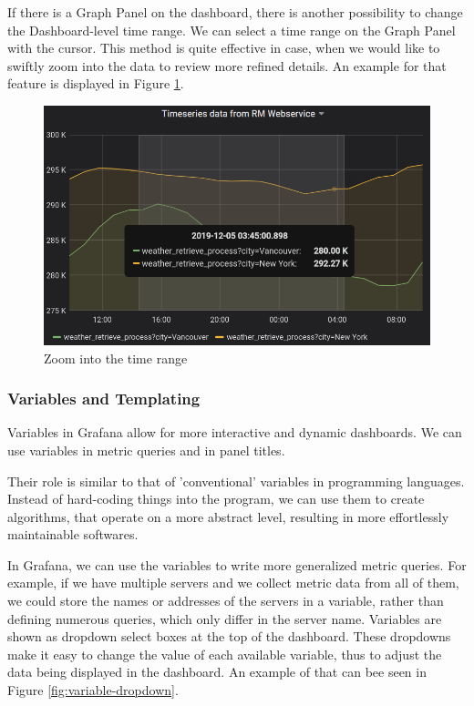 If there is a Graph Panel on the dashboard, there is another possibility to change the Dashboard-level time range. We can select a time range on the Graph Panel with the cursor. This method is quite effective in case, when we would like to swiftly zoom into the data to review more refined details. An example for that feature is displayed in Figure \ref{fig:select-time}.

\begin{figure}[h]
	\centering
	\includegraphics[width=130mm, keepaspectratio]{figures/select-time.png}
	\caption{Zoom into the time range}
	\label{fig:select-time}
\end{figure}

\subsubsection{Variables and Templating}

Variables in Grafana allow for more interactive and dynamic dashboards. We can use variables in metric queries and in panel titles.

Their role is similar to that of 'conventional' variables in programming languages. Instead of hard-coding things into the program, we can use them to create algorithms, that operate on a more abstract level, resulting in more effortlessly maintainable softwares.

In Grafana, we can use the variables to write more generalized metric queries. For example, if we have multiple servers and we collect metric data from all of them, we could store the names or addresses of the servers in a variable, rather than defining numerous queries, which only differ in the server name. Variables are shown as dropdown select boxes at the top of the dashboard. These dropdowns make it easy to change the value of each available variable, thus to adjust the data being displayed in the dashboard.\cite{grafana-variables} An example of that can bee seen in Figure \ref{fig:variable-dropdown}.

